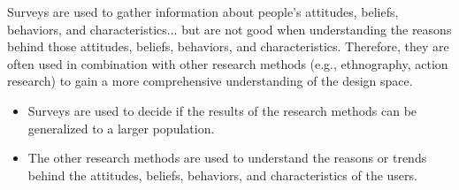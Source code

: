 Surveys are used to gather information about people's attitudes, beliefs, behaviors, and characteristics... but are not good when understanding the reasons behind those attitudes, beliefs, behaviors, and characteristics. Therefore, they are often used in combination with other research methods (e.g., ethnography, action research) to gain a more comprehensive understanding of the design space.
\begin{itemize}
    \item Surveys are used to decide if the results of the research methods can be generalized to a larger population.
    \item The other research methods are used to understand the reasons or trends behind the attitudes, beliefs, behaviors, and characteristics of the users.
\end{itemize}

